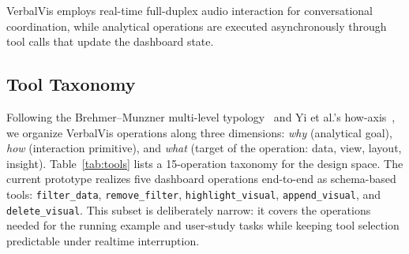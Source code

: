 \documentclass[journal]{IEEEtran}
\begin{document}
VerbalVis employs real-time full-duplex audio interaction for conversational coordination, while analytical operations are executed asynchronously through tool calls that update the dashboard state.

\subsection{Tool Taxonomy}
Following the Brehmer--Munzner multi-level typology~\cite{brehmer2013multi} and Yi et al.'s how-axis~\cite{yi2007toward}, we organize VerbalVis operations along three dimensions: \emph{why} (analytical goal), \emph{how} (interaction primitive), and \emph{what} (target of the operation: data, view, layout, insight). Table~\ref{tab:tools} lists a 15-operation taxonomy for the design space. The current prototype realizes five dashboard operations end-to-end as schema-based tools: \texttt{filter\_data}, \texttt{remove\_filter}, \texttt{highlight\_visual}, \texttt{append\_visual}, and \texttt{delete\_visual}. This subset is deliberately narrow: it covers the operations needed for the running example and user-study tasks while keeping tool selection predictable under realtime interruption.
\end{document}
